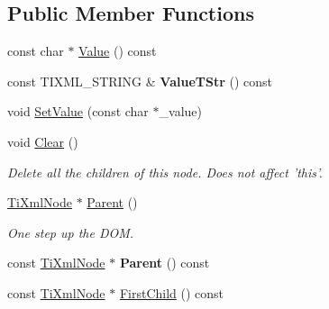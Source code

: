 \subsection*{\-Public \-Member \-Functions}
\begin{DoxyCompactItemize}
\item 
const char $\ast$ \hyperlink{classTiXmlNode_a77943eb90d12c2892b1337a9f5918b41}{\-Value} () const 
\item 
\hypertarget{classTiXmlNode_a83ece13d2ea66dac66e0b21332229239}{
const \-T\-I\-X\-M\-L\-\_\-\-S\-T\-R\-I\-N\-G \& {\bfseries \-Value\-T\-Str} () const }
\label{d3/dd5/classTiXmlNode_a83ece13d2ea66dac66e0b21332229239}

\item 
void \hyperlink{classTiXmlNode_a2a38329ca5d3f28f98ce932b8299ae90}{\-Set\-Value} (const char $\ast$\-\_\-value)
\item 
\hypertarget{classTiXmlNode_a708e7f953df61d4d2d12f73171550a4b}{
void \hyperlink{classTiXmlNode_a708e7f953df61d4d2d12f73171550a4b}{\-Clear} ()}
\label{d3/dd5/classTiXmlNode_a708e7f953df61d4d2d12f73171550a4b}

\begin{DoxyCompactList}\small\item\em \-Delete all the children of this node. \-Does not affect 'this'. \end{DoxyCompactList}\item 
\hypertarget{classTiXmlNode_ab643043132ffd794f8602685d34a982e}{
\hyperlink{classTiXmlNode}{\-Ti\-Xml\-Node} $\ast$ \hyperlink{classTiXmlNode_ab643043132ffd794f8602685d34a982e}{\-Parent} ()}
\label{d3/dd5/classTiXmlNode_ab643043132ffd794f8602685d34a982e}

\begin{DoxyCompactList}\small\item\em \-One step up the \-D\-O\-M. \end{DoxyCompactList}\item 
\hypertarget{classTiXmlNode_a78878709e53066f06eb4fcbcdd3a5260}{
const \hyperlink{classTiXmlNode}{\-Ti\-Xml\-Node} $\ast$ {\bfseries \-Parent} () const }
\label{d3/dd5/classTiXmlNode_a78878709e53066f06eb4fcbcdd3a5260}

\item 
\hypertarget{classTiXmlNode_a44c8eee26bbe2d1b2762038df9dde2f0}{
const \hyperlink{classTiXmlNode}{\-Ti\-Xml\-Node} $\ast$ \hyperlink{classTiXmlNode_a44c8eee26bbe2d1b2762038df9dde2f0}{\-First\-Child} () const }
\label{d3/dd5/classTiXmlNode_a44c8eee26bbe2d1b2762038df9dde2f0}


\end{DoxyCompactItemize}
